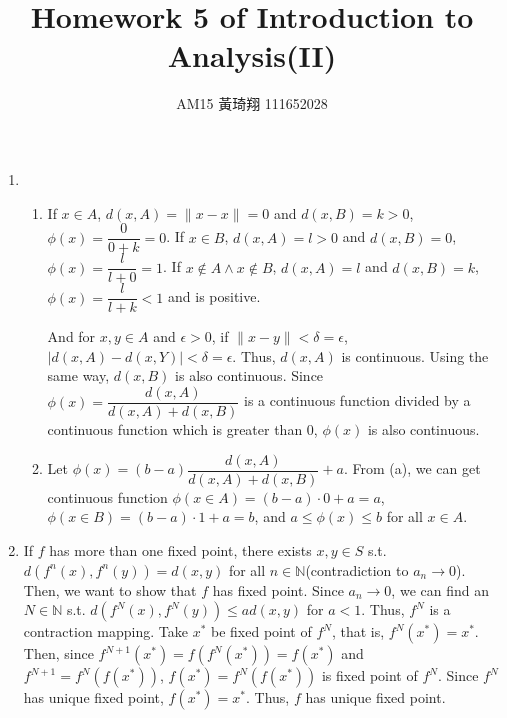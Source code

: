 \documentclass[12pt]{article}
\title{Homework 5 of Introduction to Analysis(II)}
\author{AM15 黃琦翔 111652028}
\begin{document}
\maketitle
\begin{enumerate}
    \item \begin{enumerate}
        \item If $x\in A$, $d(x, A) = \| x-x \| = 0$ and $d(x, B) = k > 0$, $\phi(x) = \dfrac{0}{0 + k} = 0$.
        If $x\in B$, $d(x, A) = l > 0$ and $d(x, B) = 0$, $\phi(x) = \dfrac{l}{l + 0} = 1$.
        If $x \notin A \wedge x \notin B$, $d(x, A) = l$ and $d(x, B) = k$, $\phi(x) = \dfrac{l}{l+k} < 1$ and is positive.

        And for $x, y \in A$ and $\epsilon > 0$,
        if $\| x- y \| < \delta = \epsilon$, 
        $|d(x, A) - d(x, Y)| < \delta = \epsilon$.
        Thus, $d(x, A)$ is continuous.
        Using the same way, $d(x, B)$ is also continuous.
        Since $\phi(x) = \dfrac{d(x, A)}{d(x, A)+d(x, B)}$ is a continuous function divided by a continuous function which is greater than $0$,
        $\phi(x)$ is also continuous.

        \item Let $\phi(x) = (b-a)\dfrac{d(x, A)}{d(x, A) + d(x, B)} + a$.
        From (a), we can get continuous function $\phi(x\in A) = (b-a)\cdot 0 + a = a$, $\phi(x\in B) = (b-a)\cdot 1 + a = b$,
        and $a \leq \phi(x)\leq b$ for all $x\in A$.
    \end{enumerate}

    \item If $f$ has more than one fixed point, there exists $x, y\in S$ s.t. $d(f^n(x), f^n(y)) = d(x, y)$ for all $n\in\mathbb{N}$(contradiction to $a_n \to 0$).
    Then, we want to show that $f$ has fixed point.
    Since $a_n\to 0$, we can find an $N\in \mathbb{N}$ s.t. $d(f^N(x), f^N(y)) \leq a d(x, y)$ for $a<1$.
    Thus, $f^N$ is a contraction mapping.
    Take $x^*$ be fixed point of $f^N$, that is, $f^N(x^*) = x^*$.
    Then, since $f^{N+1}(x^*) = f(f^N(x^*)) = f(x^*)$ and $f^{N+1} = f^N(f(x^*))$,
    $f(x^*) = f^N(f(x^*))$ is fixed point of $f^N$.
    Since $f^N$ has unique fixed point, $f(x^*) = x^*$.
    Thus, $f$ has unique fixed point.


\end{enumerate}
\end{document}
